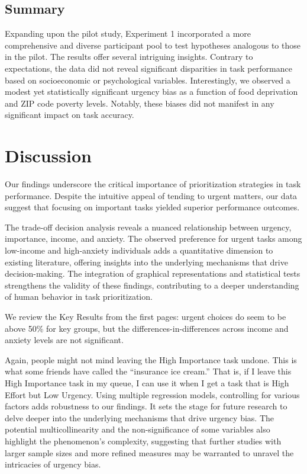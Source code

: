 \documentclass[
]{article}
\begin{document}
\hypertarget{summary-1}{%
\subsection{Summary}\label{summary-1}}

Expanding upon the pilot study, Experiment 1 incorporated a more
comprehensive and diverse participant pool to test hypotheses analogous
to those in the pilot. The results offer several intriguing insights.
Contrary to expectations, the data did not reveal significant
disparities in task performance based on socioeconomic or psychological
variables. Interestingly, we observed a modest yet statistically
significant urgency bias as a function of food deprivation and ZIP code
poverty levels. Notably, these biases did not manifest in any
significant impact on task accuracy.

\hypertarget{discussion}{%
\section{Discussion}\label{discussion}}

Our findings underscore the critical importance of prioritization
strategies in task performance. Despite the intuitive appeal of tending
to urgent matters, our data suggest that focusing on important tasks
yielded superior performance outcomes.

The trade-off decision analysis reveals a nuanced relationship between
urgency, importance, income, and anxiety. The observed preference for
urgent tasks among low-income and high-anxiety individuals adds a
quantitative dimension to existing literature, offering insights into
the underlying mechanisms that drive decision-making. The integration of
graphical representations and statistical tests strengthens the validity
of these findings, contributing to a deeper understanding of human
behavior in task prioritization.

We review the Key Results from the first pages: urgent choices do seem
to be above 50\% for key groups, but the differences-in-differences
across income and anxiety levels are not significant.

Again, people might not mind leaving the High Importance task undone.
This is what some friends have called the ``insurance ice cream.'' That
is, if I leave this High Importance task in my queue, I can use it when
I get a task that is High Effort but Low Urgency. Using multiple
regression models, controlling for various factors adds robustness to
our findings. It sets the stage for future research to delve deeper into
the underlying mechanisms that drive urgency bias. The potential
multicollinearity and the non-significance of some variables also
highlight the phenomenon's complexity, suggesting that further studies
with larger sample sizes and more refined measures may be warranted to
unravel the intricacies of urgency bias.
\end{document}
